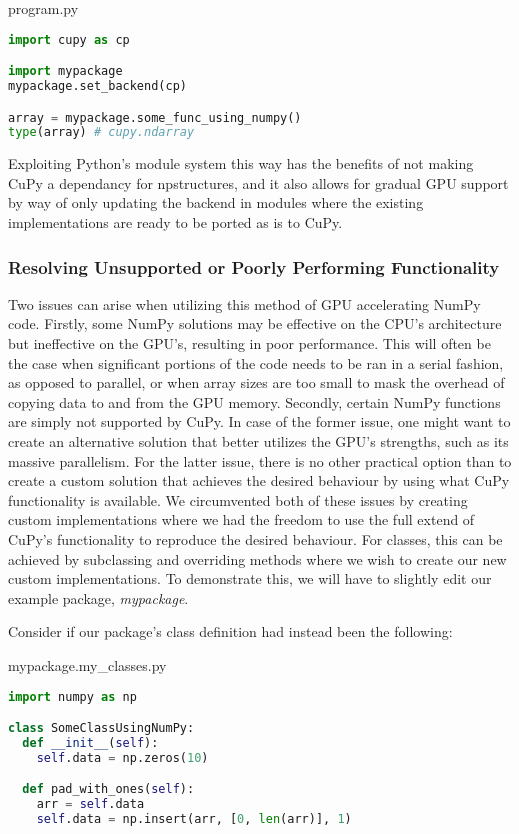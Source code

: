 \begin{center}
program.py
\end{center}
\begin{lstlisting}[language=Python,style=pycode]
import cupy as cp

import mypackage
mypackage.set_backend(cp)

array = mypackage.some_func_using_numpy()
type(array) # cupy.ndarray
\end{lstlisting}

Exploiting Python's module system this way has the benefits of not making CuPy a dependancy for npstructures, and it also allows for gradual GPU support by way of only updating the backend in modules where the existing implementations are ready to be ported as is to CuPy.

\subsubsection{Resolving Unsupported or Poorly Performing Functionality}
Two issues can arise when utilizing this method of GPU accelerating NumPy code.
Firstly, some NumPy solutions may be effective on the CPU's architecture but ineffective on the GPU's, resulting in poor performance.
This will often be the case when significant portions of the code needs to be ran in a serial fashion, as opposed to parallel, or when array sizes are too small to mask the overhead of copying data to and from the GPU memory.
Secondly, certain NumPy functions are simply not supported by CuPy.
In case of the former issue, one might want to create an alternative solution that better utilizes the GPU's strengths, such as its massive parallelism.
For the latter issue, there is no other practical option than to create a custom solution that achieves the desired behaviour by using what CuPy functionality is available.
We circumvented both of these issues by creating custom implementations where we had the freedom to use the full extend of CuPy's functionality to reproduce the desired behaviour.
For classes, this can be achieved by subclassing and overriding methods where we wish to create our new custom implementations.
To demonstrate this, we will have to slightly edit our example package, \textit{mypackage}.

Consider if our package's class definition had instead been the following:
\begin{center}
mypackage.my\_classes.py
\end{center}
\begin{lstlisting}[language=Python,style=pycode]
import numpy as np

class SomeClassUsingNumPy:
  def __init__(self):
    self.data = np.zeros(10)

  def pad_with_ones(self):
    arr = self.data
    self.data = np.insert(arr, [0, len(arr)], 1)
\end{lstlisting}

